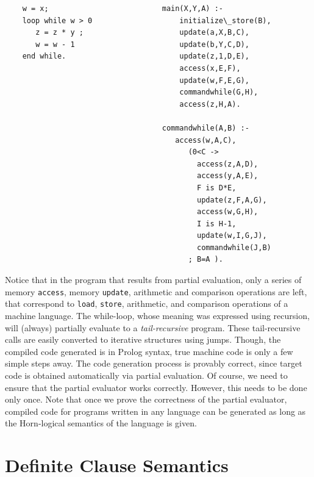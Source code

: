 \documentclass{entcs}
\begin{document}
\begin{verbatim}
    w = x;                          main(X,Y,A) :-
    loop while w > 0                    initialize\_store(B),
       z = z * y ;                      update(a,X,B,C),  
       w = w - 1                        update(b,Y,C,D), 
    end while.                          update(z,1,D,E),
                                        access(x,E,F),    
                                        update(w,F,E,G),
                                        commandwhile(G,H),
                                        access(z,H,A).
          
                                    commandwhile(A,B) :- 
                                       access(w,A,C),
                                          (0<C -> 
                                            access(z,A,D), 
                                            access(y,A,E), 
                                            F is D*E, 
                                            update(z,F,A,G),
                                            access(w,G,H), 
                                            I is H-1, 
                                            update(w,I,G,J),
                                            commandwhile(J,B)
                                          ; B=A ).
\end{verbatim}

Notice that in the program that results from partial evaluation,  
only a series of memory {\tt access}, memory {\tt update}, arithmetic and comparison 
operations are left, that correspond
to {\tt load}, {\tt store}, arithmetic, and comparison 
operations of a machine language. 
The while-loop, whose meaning was expressed using recursion, will
(always) partially
evaluate to a {\it tail-recursive} program.
These tail-recursive calls
are easily converted to iterative structures using jumps.  
Though, the compiled code generated is in Prolog syntax,
true machine code is only a few simple steps away.
The code generation process is provably correct, since target code
is obtained automatically
via partial evaluation. Of course, we need to ensure that the
partial evaluator works correctly. However, this needs to be
 done only once.  Note that once
we prove the correctness of the partial evaluator, compiled code
for programs written in any language can be generated as long as
the Horn-logical semantics of the language is given.

\section{Definite Clause Semantics}
\end{document}
